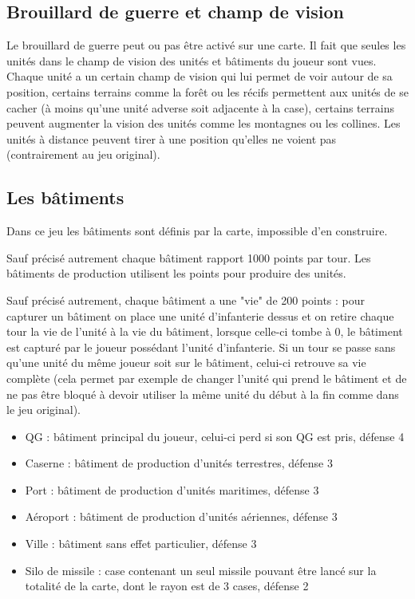\documentclass[a4paper,10pt]{article} %
\begin{document}
\subsection{Brouillard de guerre et champ de vision}
Le brouillard de guerre peut ou pas être activé sur une carte. Il fait que seules les unités dans le champ de vision des unités et bâtiments du joueur sont vues.\\

Chaque unité a un certain champ de vision qui lui permet de voir autour de sa position, certains terrains comme la forêt ou les récifs permettent aux unités de se cacher (à moins qu'une unité adverse soit adjacente à la case), certains terrains peuvent augmenter la vision des unités comme les montagnes ou les collines. Les unités à distance peuvent tirer à une position qu'elles ne voient pas (contrairement au jeu original).

\subsection{Les bâtiments}
Dans ce jeu les bâtiments sont définis par la carte, impossible d'en construire.

Sauf précisé autrement chaque bâtiment rapport 1000 points par tour. Les bâtiments de production utilisent les points pour produire des unités.

Sauf précisé autrement, chaque bâtiment a une "vie" de 200 points : pour capturer un bâtiment on place une unité d'infanterie dessus et on retire chaque tour la vie de l'unité à la vie du bâtiment, lorsque celle-ci tombe à 0, le bâtiment est capturé par le joueur possédant l'unité d'infanterie. Si un tour se passe sans qu'une unité du même joueur soit sur le bâtiment, celui-ci retrouve sa vie complète (cela permet par exemple de changer l'unité qui prend le bâtiment et de ne pas être bloqué à devoir utiliser la même unité du début à la fin comme dans le jeu original).

\begin{itemize}
\item QG : bâtiment principal du joueur, celui-ci perd si son QG est pris, défense 4
\item Caserne : bâtiment de production d'unités terrestres, défense 3
\item Port : bâtiment de production d'unités maritimes, défense 3
\item Aéroport : bâtiment de production d'unités aériennes, défense 3
\item Ville : bâtiment sans effet particulier, défense 3
\item Silo de missile : case contenant un seul missile pouvant être lancé sur la totalité de la carte, dont le rayon est de 3 cases, défense 2
\end{itemize}
\end{document}

